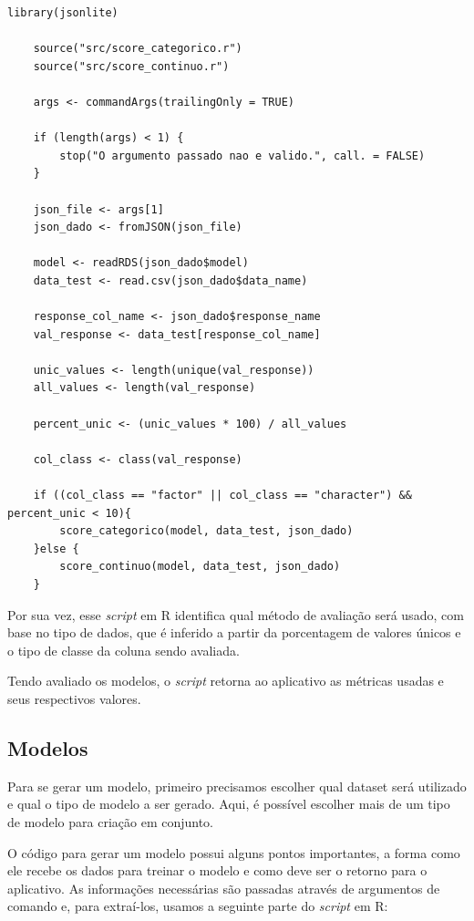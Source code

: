 \documentclass[
    12pt,               %
    openright,          %
    oneside,            %
    a4paper,            %
    english,            %
    brazil              %
    ]{abntex2}
\begin{document}
\begin{lstlisting}[style=r_code]
    library(jsonlite)

    source("src/score_categorico.r")
    source("src/score_continuo.r")

    args <- commandArgs(trailingOnly = TRUE)

    if (length(args) < 1) {
        stop("O argumento passado nao e valido.", call. = FALSE)
    }

    json_file <- args[1]
    json_dado <- fromJSON(json_file)

    model <- readRDS(json_dado$model)
    data_test <- read.csv(json_dado$data_name)

    response_col_name <- json_dado$response_name
    val_response <- data_test[response_col_name]

    unic_values <- length(unique(val_response))
    all_values <- length(val_response)

    percent_unic <- (unic_values * 100) / all_values

    col_class <- class(val_response)

    if ((col_class == "factor" || col_class == "character") &&  percent_unic < 10){
        score_categorico(model, data_test, json_dado)
    }else {
        score_continuo(model, data_test, json_dado)
    }
\end{lstlisting}

Por sua vez, esse \textit{script} em R identifica qual método de avaliação será usado,
com base no tipo de dados, que é inferido a partir da porcentagem de valores
únicos e o tipo de classe da coluna sendo avaliada.

Tendo avaliado os modelos, o \textit{script} retorna ao aplicativo as métricas usadas e seus
respectivos valores.

\subsection{Modelos}

Para se gerar um modelo, primeiro precisamos escolher qual dataset será utilizado e qual o tipo de modelo a ser gerado. Aqui, é possível
escolher mais de um tipo de modelo para criação em conjunto. 

O código para gerar um modelo possui alguns pontos importantes, a forma como ele recebe os dados para treinar o modelo e como deve ser
o retorno para o aplicativo. As informações necessárias são passadas através de argumentos de comando e, para extraí-los, usamos a
seguinte parte do \textit{script} em R:
\end{document}
